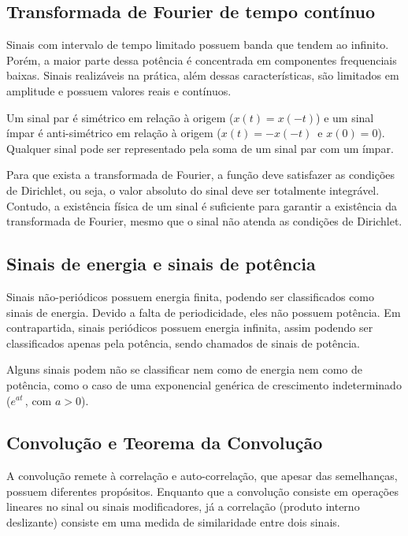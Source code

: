 \subsection*{Transformada de Fourier de tempo contínuo}

Sinais com intervalo de tempo limitado possuem banda que tendem ao infinito. Porém, a maior parte dessa potência é concentrada em componentes frequenciais baixas. Sinais realizáveis na prática, além dessas características, são limitados em amplitude e possuem valores reais e contínuos. \cite{ref3}

Um sinal par é simétrico em relação à origem ($x(t)=x(-t)$) e um sinal ímpar é anti-simétrico em relação à origem ($x(t)=-x(-t)\,$ e $x(0)=0$). Qualquer sinal pode ser representado pela soma de um sinal par com um ímpar. \cite{ref3}

Para que exista a transformada de Fourier, a função deve satisfazer as condições de Dirichlet, ou seja, o valor absoluto do sinal deve ser totalmente integrável. Contudo, a existência física de um sinal é suficiente para garantir a existência da transformada de Fourier, mesmo que o sinal não atenda as condições de Dirichlet. \cite{ref5}

\subsection*{Sinais de energia e sinais de potência}

Sinais não-periódicos possuem energia finita, podendo ser classificados como sinais de energia. Devido a falta de periodicidade, eles não possuem potência. Em contrapartida, sinais periódicos possuem energia infinita, assim podendo ser classificados apenas pela potência, sendo chamados de sinais de potência. \cite{ref4}

Alguns sinais podem não se classificar nem como de energia nem como de potência, como o caso de uma exponencial genérica de crescimento indeterminado ($e^{at} \,$, com $a>0$). \cite{ref4}

\subsection*{Convolução e Teorema da Convolução}

A convolução remete à correlação e auto-correlação, que apesar das semelhanças, possuem diferentes propósitos. Enquanto que a convolução consiste em operações lineares no sinal ou sinais modificadores, já a correlação (produto interno deslizante) consiste em uma medida de similaridade entre dois sinais.

